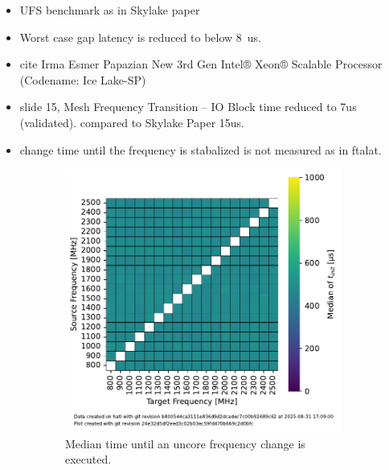 \begin{itemize}
    \item UFS benchmark as in Skylake paper
    \item Worst case gap latency is reduced to below \SI{8}{us}.
    \item cite Irma Esmer Papazian New 3rd Gen Intel® Xeon® Scalable Processor (Codename: Ice Lake-SP)
    \item slide 15, Mesh Frequency Transition – IO Block time reduced to 7us (validated). compared to Skylake Paper 15us.
    \item change time until the frequency is stabalized is not measured as in ftalat.
\end{itemize}


\begin{figure}[]
    \begin{subfigure}[t]{0.3\linewidth}
        \centering
        \includegraphics[width=\linewidth]{fig/uncore-frequency-switching-latency/median-t-init.pdf}
        \caption{\label{fig:a}Median time until an uncore frequency change is executed.}
    \end{subfigure}
    \hfill
    \begin{subfigure}[t]{0.3\linewidth}
        \centering

\end{subfigure}
\end{figure}
